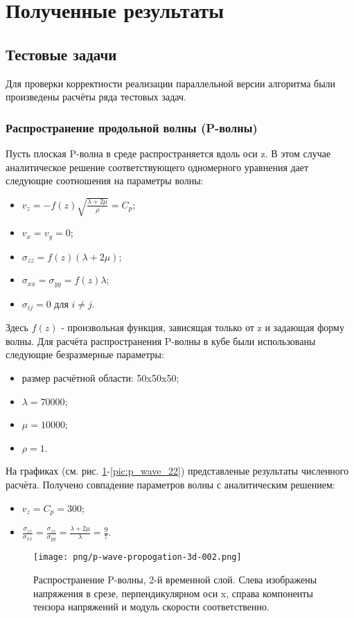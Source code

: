 \section{Полученные результаты}
\subsection{Тестовые задачи}
Для проверки корректности реализации параллельной версии алгоритма были
произведены расчёты ряда тестовых задач.
\subsubsection{Распространение продольной волны (P-волны)}
Пусть плоская P-волна в среде распространяется вдоль оси z. В этом случае аналитическое решение соответствующего одномерного уравнения дает следующие соотношения на параметры волны:
\begin{itemize}
\item $v_z=-f(z)\sqrt{\frac{\lambda+2\mu}{\rho}}=C_p$;
\item $v_x=v_y=0$;
\item $\sigma_{zz}=f(z)(\lambda+2\mu)$;
\item $\sigma_{xx}=\sigma_{yy}=f(z)\lambda$;
\item $\sigma_{ij}=0$ для $i \neq j$.
\end{itemize}
Здесь $f(z)$ - произвольная функция, зависящая только от z и задающая форму волны.
Для расчёта распространения P-волны в кубе были использованы следующие безразмерные параметры: 
\begin{itemize}
\item размер расчётной области: 50x50x50;
\item $\lambda=70000$;
\item $\mu=10000$;
\item $\rho=1$.
\end{itemize}
На графиках (см. рис.
\ref{pic:p_wave_2}-\ref{pic:p_wave_22}) представленые результаты численного расчёта. Получено совпадение параметров волны с аналитическим решением:
\begin{itemize}
\item $v_z=C_p=300$;
\item $\frac{\sigma_{zz}}{\sigma_{xx}}=\frac{\sigma_{zz}}{\sigma_{yy}}=\frac{\lambda+2\mu}{\lambda}=\frac{9}{7}$.
\end{itemize}
\begin{figure}[htp]
\centering
\texttt{[image: png/p-wave-propogation-3d-002.png]}
\caption{Распространение P-волны, 2-й временной слой. Слева изображены
напряжения в срезе, перпендикулярном оси x, справа компоненты тензора напряжений
и модуль скорости соответственно.}
\label{pic:p_wave_2}
\end{figure}
